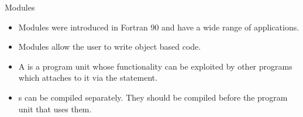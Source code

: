 \documentclass[10pt,t]{beamer}
\begin{document}
\begin{frame}{Modules}
  \begin{itemize}
    \item Modules were introduced in Fortran 90 and have a wide range of applications.
    \item Modules allow the user to write object based code.
    \item A  is a program unit whose functionality can be exploited by other programs which attaches to it via the  statement.
    \item {}s can be compiled separately. {\color{red}They should be compiled before the program unit that uses them}.


\end{itemize}
\end{frame}
\end{document}
